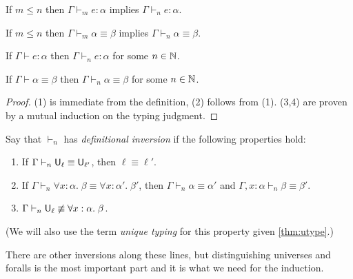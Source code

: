 \begin{lemma}
\begin{thmlist}
\item If $m\le n$ then $\Gamma\vdash_m e:\alpha$ implies $\Gamma\vdash_n e:\alpha$.
\item If $m\le n$ then $\Gamma\vdash_m\alpha\equiv\beta$ implies $\Gamma\vdash_n \alpha\equiv\beta$.
\item If $\Gamma\vdash e:\alpha$ then $\Gamma\vdash_n e:\alpha$ for some $n\in\mathbb{N}$.
\item If $\Gamma\vdash\alpha\equiv\beta$ then $\Gamma\vdash_n \alpha\equiv\beta$ for some $n\in\mathbb{N}$.
\end{thmlist}
\end{lemma}
\begin{proof}
(1) is immediate from the definition, (2) follows from (1). (3,4) are proven by a mutual induction on the typing judgment.
\end{proof}
\begin{definition}
Say that $\vdash_n$ has \emph{definitional inversion} if the following properties hold:
\begin{enumerate}
\item If $\Gamma\vdash_n \U_\ell\equiv\U_{\ell'}$, then $\ell\equiv\ell'$.
\item If $\Gamma\vdash_n \forall x:\alpha.\;\beta\equiv\forall x:\alpha'.\;\beta'$, then $\Gamma\vdash_n \alpha\equiv\alpha'$ and $\Gamma,x:\alpha\vdash_n \beta\equiv \beta'$.
\item $\Gamma\vdash_n \U_\ell\not\equiv\forall x:\alpha.\;\beta$.
\end{enumerate}
(We will also use the term \emph{unique typing} for this property given \autoref{thm:utype}.) 
\end{definition}
There are other inversions along these lines, but distinguishing universes and foralls is the most important part and it is what we need for the induction.

